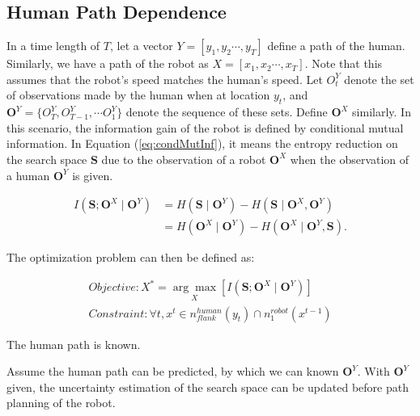 \documentclass[12pt]{article}
\begin{document}
\subsection{Human Path Dependence}

In a time length of $ T $, let a vector $ Y = [y_{1}, y_{2} \cdots , y_{T}] $ define a path of the human. Similarly, we have a path of the robot as $ X = [x_{1}, x_{2} \cdots, x_{T}] $. Note that this assumes that the robot's speed matches the human's speed. Let $ O^{Y}_{t} $ denote the set of observations made by the human when at location $ y_{t} $, and $ \textbf{O}^{Y} = \{ O^{Y}_{T}, O^{Y}_{T-1}, \cdots O^{Y}_{1} \} $ denote the sequence of these sets. Define $ \textbf{O}^{X} $ similarly. In this scenario, the information gain of the robot is defined by conditional mutual information. In Equation (\ref{eq:condMutInf}), it means the entropy reduction on the search space $ \textbf{S} $ due to the observation of a robot $ \textbf{O}^{X} $ when the observation of a human $ \textbf{O}^{Y} $ is given.

\begin{equation}
\label{eq:condMutInf}
\begin{aligned}
I(\textbf{S}; \textbf{O}^{X} \mid \textbf{O}^{Y}) & = H(\textbf{S} \mid \textbf{O}^{Y}) - H(\textbf{S} \mid \textbf{O}^{X},\textbf{O}^{Y})\\
& = H(\textbf{O}^{X} \mid \textbf{O}^{Y}) - H(\textbf{O}^{X} \mid \textbf{O}^{Y}, \textbf{S}).
\end{aligned}
\end{equation}

The optimization problem can then be defined as:

\begin{equation}
\label{eq:objFunc}
\begin{aligned}
Objective: X^{*} = \underset{X}{\arg\max} [I(\textbf{S}; \textbf{O}^{X} \mid \textbf{O}^{Y})] \\
Constraint: \forall t, x^{t} \in n^{human}_{flank}(y_{t}) \cap n^{robot}_{1}(x^{t-1}) 
\end{aligned}
\end{equation}

\begin{defn}
\label{Assumption1}

The human path is known.

\end{defn}

Assume the human path can be predicted, by which we can known $ \textbf{O}^{Y} $. With $ \textbf{O}^{Y} $ given, the uncertainty estimation of the search space can be updated before path planning of the robot. 
\end{document}
